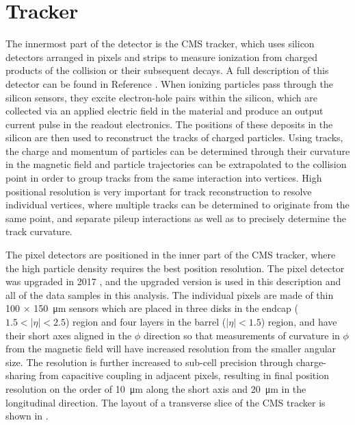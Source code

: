 \section{Tracker}
The innermost part of the detector is the CMS tracker, which uses silicon detectors arranged in pixels and strips to measure ionization from charged products of the collision or their subsequent decays. 
A full description of this detector can be found in Reference \cite{trackerTDR}.
When ionizing particles pass through the silicon sensors, they excite electron-hole pairs within the silicon, which are collected via an applied electric field in the material and produce an output current pulse in the readout electronics.
The positions of these deposits in the silicon are then used to reconstruct the tracks of charged particles.
Using tracks, the charge and momentum of particles can be determined through their curvature in the magnetic field and particle trajectories can be extrapolated to the collision point in order to group tracks from the same interaction into vertices. 
High positional resolution is very important for track reconstruction to resolve individual vertices, where multiple tracks can be determined to originate from the same point, and separate pileup interactions as well as to precisely determine the track curvature. 

The pixel detectors are positioned in the inner part of the CMS tracker, where the high particle density requires the best position resolution. 
The pixel detector was upgraded in 2017 \cite{pixelUpgrade}, and the upgraded version is used in this description and all of the data samples in this analysis. 
The individual pixels are made of thin 100 $\times$ \SI{150}{\micro\meter} sensors which are placed in three disks in the endcap ($1.5<\lvert\eta\rvert<2.5$) region and four layers in the barrel ($\lvert\eta\rvert<1.5$) region, and have their short axes aligned in the $\phi$ direction so that measurements of curvature in $\phi$ from the magnetic field will have increased resolution from the smaller angular size. 
The resolution is further increased to sub-cell precision through charge-sharing from capacitive coupling in adjacent pixels, resulting in final position resolution on the order of \SI{10}{\micro\meter} along the short axis and \SI{20}{\micro\meter} in the longitudinal direction.
The layout of a transverse slice of the CMS tracker is shown in .

